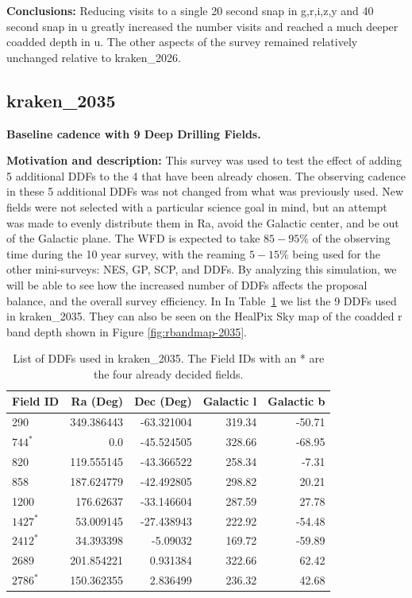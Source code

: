 \documentclass[DM,authoryear,toc]{lsstdoc}
\begin{document}
\textbf{Conclusions:}  Reducing visits to a single 20 second snap in g,r,i,z,y and 40 second snap in u greatly increased
the number visits and reached a much deeper coadded depth in u. The other aspects of the survey remained relatively
unchanged relative to kraken\_2026.


\subsection{kraken\_2035}  \label{kraken2035}

\textbf{Baseline cadence with 9 Deep Drilling Fields.}

\textbf{Motivation and description:} This survey was used to test the effect of adding 5 additional
DDFs to the 4 that have been already chosen. The observing cadence in these 5 additional DDFs
was not changed from what was previously used. New fields were not selected with a
particular science goal in mind, but an attempt was made to evenly distribute them in Ra, avoid
the Galactic center, and be out of the Galactic plane. The WFD is expected to take $85-95\%$ of
the observing time during the 10 year survey, with the reaming $5-15\%$ being used for the
other mini-surveys: NES, GP, SCP, and DDFs. By analyzing this simulation, we will be able to see
how the increased number of DDFs affects the proposal balance, and the overall survey efficiency.
In In Table~\ref{tab:ddfs} we list the 9 DDFs used in kraken\_2035. They can also be seen on the
HealPix Sky map of the coadded r band depth shown in Figure \autoref{fig:rbandmap-2035}.

\begin{table}[htp]
\caption{List of DDFs used in kraken\_2035. The Field IDs with an * are the four already decided fields.}
\begin{center}
\small
\begin{tabular}{lrrrr}
\toprule
Field ID & Ra (Deg) & Dec (Deg) & Galactic l & Galactic b \\
\midrule
290  & 349.386443 & -63.321004 & 319.34 & -50.71 \\
$744^{*}$  &   0.0      & -45.524505 & 328.66 & -68.95 \\
820  & 119.555145 & -43.366522 & 258.34 & -7.31 \\
858  & 187.624779 & -42.492805 & 298.82 &  20.21 \\
1200 & 176.62637  & -33.146604 & 287.59 &  27.78 \\
$1427^{*}$ & 53.009145  & -27.438943 & 222.92 & -54.48 \\
$2412^{*}$ & 34.393398  & -5.09032   & 169.72 & -59.89 \\
2689 & 201.854221 &  0.931384  & 322.66 &  62.42 \\
$2786^{*}$ & 150.362355 &  2.836499  & 236.32 &  42.68 \\
\bottomrule
\end{tabular}
\end{center}
\label{tab:ddfs}
\end{table}
\end{document}
